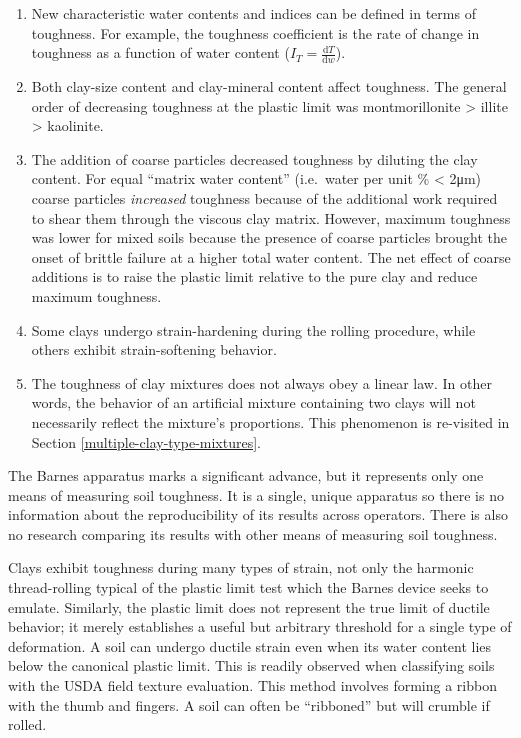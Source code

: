 \documentclass[
  letterpaper,
  openany]{book}
\providecommand{\tightlist}{%
  \setlength{\itemsep}{0pt}\setlength{\parskip}{0pt}}
\begin{document}
\begin{enumerate}
\def\labelenumi{\arabic{enumi}.}
\tightlist
\item
  New characteristic water contents and indices can be defined in terms of toughness. For example, the toughness coefficient is the rate of change in toughness as a function of water content (\(I_T=\frac{\text{d}T}{\text{d}w}\)).
\item
  Both clay-size content and clay-mineral content affect toughness. The general order of decreasing toughness at the plastic limit was montmorillonite \textgreater{} illite \textgreater{} kaolinite.
\item
  The addition of coarse particles decreased toughness by diluting the clay content. For equal ``matrix water content'' (i.e.~water per unit \% \textless{} 2μm) coarse particles \emph{increased} toughness because of the additional work required to shear them through the viscous clay matrix. However, maximum toughness was lower for mixed soils because the presence of coarse particles brought the onset of brittle failure at a higher total water content. The net effect of coarse additions is to raise the plastic limit relative to the pure clay and reduce maximum toughness.
\item
  Some clays undergo strain-hardening during the rolling procedure, while others exhibit strain-softening behavior.
\item
  The toughness of clay mixtures does not always obey a linear law. In other words, the behavior of an artificial mixture containing two clays will not necessarily reflect the mixture's proportions. This phenomenon is re-visited in Section \ref{multiple-clay-type-mixtures}.
\end{enumerate}

The Barnes apparatus marks a significant advance, but it represents only one means of measuring soil toughness.
It is a single, unique apparatus so there is no information about the reproducibility of its results across operators.
There is also no research comparing its results with other means of measuring soil toughness.

Clays exhibit toughness during many types of strain, not only the harmonic thread-rolling typical of the plastic limit test which the Barnes device seeks to emulate.
Similarly, the plastic limit does not represent the true limit of ductile behavior; it merely establishes a useful but arbitrary threshold for a single type of deformation.
A soil can undergo ductile strain even when its water content lies below the canonical plastic limit.
This is readily observed when classifying soils with the USDA field texture evaluation. This method involves forming a ribbon with the thumb and fingers.
A soil can often be ``ribboned'' but will crumble if rolled.
\end{document}
